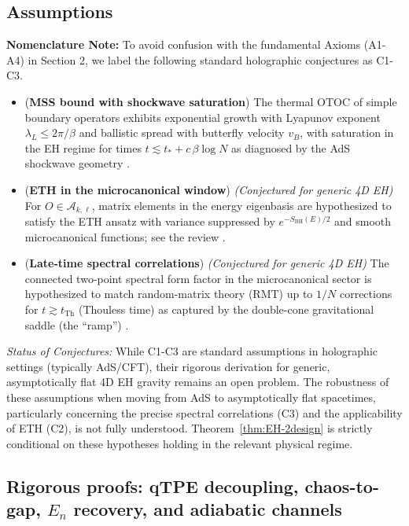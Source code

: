 \documentclass[11pt,a4paper]{article}
\providecommand{\texorpdfstring}[2]{#1}
\theoremstyle{plain}
\theoremstyle{definition}
\theoremstyle{remark}
\begin{document}
\subsection{Assumptions}
\textbf{Nomenclature Note:} To avoid confusion with the fundamental Axioms (A1-A4) in Section 2, we label the following standard holographic conjectures as C1-C3.
\begin{itemize}[leftmargin=*]
  \item[C1.] ({\bf MSS bound with shockwave saturation}) The thermal OTOC of simple boundary operators exhibits exponential growth with Lyapunov exponent $\lambda_L\le 2\pi/\beta$ and ballistic spread with butterfly velocity $v_B$, with saturation in the EH regime for times $t\lesssim t_\ast+c\,\beta\log N$ as diagnosed by the AdS shockwave geometry \cite{Maldacena:2016,ShenkerStanford:2014}.
  \item[C2.] ({\bf ETH in the microcanonical window}) \textit{(Conjectured for generic 4D EH)} For $O\in \mathscr{A}_{k,\ell}$, matrix elements in the energy eigenbasis are hypothesized to satisfy the ETH ansatz with variance suppressed by $e^{-S_{\mathrm{BH}}(E)/2}$ and smooth microcanonical functions; see the review \cite{DAlessioKafriPolkovnikovRigol2016}.
  \item[C3.] ({\bf Late-time spectral correlations}) \textit{(Conjectured for generic 4D EH)} The connected two-point spectral form factor in the microcanonical sector is hypothesized to match random-matrix theory (RMT) up to $1/N$ corrections for $t\gtrsim t_{\mathrm{Th}}$ (Thouless time) as captured by the double-cone gravitational saddle (the ``ramp'') \cite{SaadShenkerStanford2019,Cotler:2017}.
\end{itemize}

\noindent\textit{Status of Conjectures:} While C1-C3 are standard assumptions in holographic settings (typically AdS/CFT), their rigorous derivation for generic, asymptotically flat 4D EH gravity remains an open problem. The robustness of these assumptions when moving from AdS to asymptotically flat spacetimes, particularly concerning the precise spectral correlations (C3) and the applicability of ETH (C2), is not fully understood. Theorem~\ref{thm:EH-2design} is strictly conditional on these hypotheses holding in the relevant physical regime.


\subsection{Rigorous proofs: qTPE decoupling, chaos-to-gap, \texorpdfstring{$E_n$}{En} recovery, and adiabatic channels}\label{sec:rigorous-results}
\providecommand{\Mtwo}{\mathcal{M}^{(2)}}
\providecommand{\FP}{\mathcal{F}}
\end{document}
